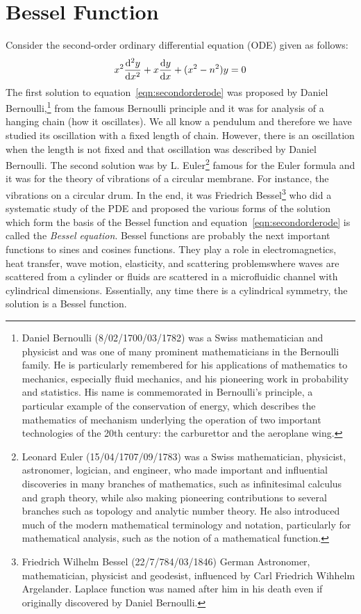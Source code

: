 \section{Bessel Function}
Consider the second-order ordinary differential equation (ODE) given as follows:
\begin{align}
x^2 \derivative[2]{y}{x} + x \derivative{y}{x} + (x^2 - n^2)y = 0
\label{eqn:secondorderode}
\end{align}
The first solution to equation~\eqref{eqn:secondorderode} was proposed by Daniel Bernoulli,\footnote{
Daniel Bernoulli (8/02/1700/03/1782) was a Swiss mathematician and physicist and was one of many prominent mathematicians in the Bernoulli family. He is particularly remembered for his applications of mathematics to mechanics, especially fluid mechanics, and his pioneering work in probability and statistics. His name is commemorated in Bernoulli's principle, a particular example of the conservation of energy, which describes the mathematics of mechanism underlying the operation of two important technologies of the 20th century: the carburettor and the aeroplane wing.
}
from the famous Bernoulli principle and it was for analysis of a hanging chain (how it oscillates). We all know a pendulum and therefore we have studied its oscillation with a fixed length of chain. However, there is an oscillation when the length is not fixed and that oscillation was described by Daniel Bernoulli. The second solution was by L. Euler\footnote{
Leonard Euler (15/04/1707/09/1783) was a Swiss mathematician, physicist, astronomer, logician, and engineer, who made important and influential discoveries in many branches of mathematics, such as infinitesimal calculus and graph theory, while also making pioneering contributions to several branches such as topology and analytic number theory. He also introduced much of the modern mathematical terminology and notation, particularly for mathematical analysis, such as the notion of a mathematical function.
} famous for the Euler formula and it was for the theory of vibrations of a circular membrane. For instance, the vibrations on a circular drum. In the end, it was Friedrich Bessel\footnote{
Friedrich Wilhelm Bessel (22/7/784/03/1846) German Astronomer, mathematician, physicist and geodesist, influenced by Carl Friedrich Wihhelm Argelander. Laplace function was named after him in his death even if originally discovered by Daniel Bernoulli.
} who did a systematic study of the PDE and proposed the various forms of the solution which form the basis of the Bessel function and equation~\eqref{eqn:secondorderode} is called the \emph{Bessel equation}. Bessel functions are probably the next important functions to sines and cosines functions. They play a role in electromagnetics, heat transfer, wave motion, elasticity, and scattering problems\textemdash where waves are scattered from a cylinder or fluids are scattered in a microfluidic channel with cylindrical dimensions. Essentially, any time there is a cylindrical symmetry, the solution is a Bessel function.

